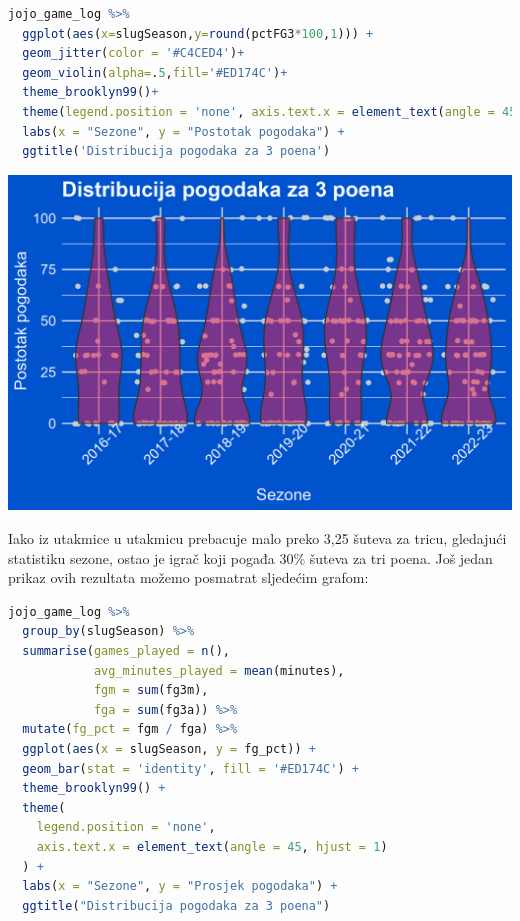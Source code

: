 \documentclass[letterpaper,11pt,leqno]{article}
\begin{document}
\begin{lstlisting}[language=R]
jojo_game_log %>%
  ggplot(aes(x=slugSeason,y=round(pctFG3*100,1))) +
  geom_jitter(color = '#C4CED4')+
  geom_violin(alpha=.5,fill='#ED174C')+ 
  theme_brooklyn99()+
  theme(legend.position = 'none', axis.text.x = element_text(angle = 45))+
  labs(x = "Sezone", y = "Postotak pogodaka") + 
  ggtitle('Distribucija pogodaka za 3 poena')
\end{lstlisting}

\begin{center}
    \includegraphics{DistribucijaTrica.png}
\end{center}

Iako iz utakmice u utakmicu prebacuje malo preko 3,25 šuteva za tricu, gledajući statistiku sezone, ostao je igrač koji pogađa 30\% šuteva za tri poena. Još jedan prikaz ovih rezultata možemo posmatrat sljedećim grafom:

\begin{lstlisting}[language=R]
jojo_game_log %>% 
  group_by(slugSeason) %>% 
  summarise(games_played = n(),
            avg_minutes_played = mean(minutes),
            fgm = sum(fg3m),
            fga = sum(fg3a)) %>% 
  mutate(fg_pct = fgm / fga) %>% 
  ggplot(aes(x = slugSeason, y = fg_pct)) + 
  geom_bar(stat = 'identity', fill = '#ED174C') + 
  theme_brooklyn99() + 
  theme(
    legend.position = 'none',
    axis.text.x = element_text(angle = 45, hjust = 1)
  ) + 
  labs(x = "Sezone", y = "Prosjek pogodaka") + 
  ggtitle("Distribucija pogodaka za 3 poena")
\end{lstlisting}
\end{document}
